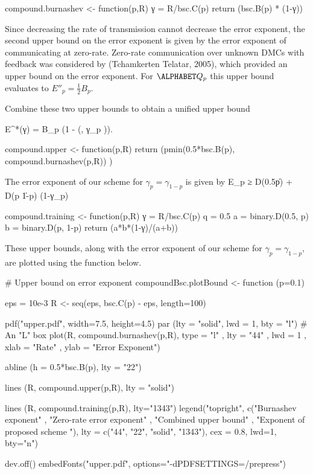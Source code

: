 \starttyping
  compound.burnashev <- function(p,R)
  {
    γ = R/bsc.C(p)
    return (bsc.B(p) * (1-γ))
  }
\stoptyping

Since decreasing the rate of transmission cannot decrease the error
exponent, the second upper bound on the error exponent is given by
the error exponent of communicating at zero-rate. Zero-rate
communication over unknown DMCs with feedback was considered by
(Tchamkerten Telatar, 2005), which provided an upper bound on the
error exponent. For $\ALPHABET Q_p$ this upper bound evaluates to
$E''_p = \tfrac 12 B_p$.

Combine these two upper bounds to obtain a unified upper bound

\startformula E^*(γ) = B_p (1 - \max(, γ_p )). \stopformula

\starttyping
  compound.upper <- function(p,R)
  {
    return (pmin(0.5*bsc.B(p), compound.burnashev(p,R)) )
  }
\stoptyping

The error exponent of our scheme for $γ_p = γ_{1-p}$ is given by
\startformula E_p ≥ 
            {D(0.5\|p) + D(p \| 1-p)} 
            (1-γ_p)                          \stopformula

\starttyping
  compound.training <- function(p,R) 
  {
    γ = R/bsc.C(p)
    q = 0.5
    a = binary.D(0.5, p)
    b = binary.D(p, 1-p)
    return (a*b*(1-γ)/(a+b))
  }
\stoptyping

These upper bounds, along with the error exponent of our scheme for
$γ_p = γ_{1-p}$, are plotted using the function below.

\starttyping
# Upper bound on error exponent 
compoundBsc.plotBound <- function (p=0.1)
{
  eps = 10e-3
  R <- seq(eps, bsc.C(p) - eps, length=100)

  pdf("upper.pdf", width=7.5, height=4.5)
  par (lty = "solid", lwd = 1, bty = "l")           # An "L" box
  plot(R, compound.burnashev(p,R), 
       type = "l"  ,
       lty  = "44" ,
       lwd  = 1    ,
       xlab = "Rate" ,
       ylab = "Error Exponent")

  abline (h = 0.5*bsc.B(p), lty = "22")

  lines (R, compound.upper(p,R), lty = "solid")

  lines (R, compound.training(p,R), lty="1343") 
  legend("topright",
         c("Burnashev exponent"          ,
           "Zero-rate error exponent"    , 
           "Combined upper bound"        ,
           "Exponent of proposed scheme "),
        lty = c("44", "22", "solid", "1343"),
        cex = 0.8, lwd=1, bty="n")

  dev.off()
  embedFonts("upper.pdf", options="-dPDFSETTINGS=/prepress")
}
\stoptyping

{\externalfigure[upper]}
